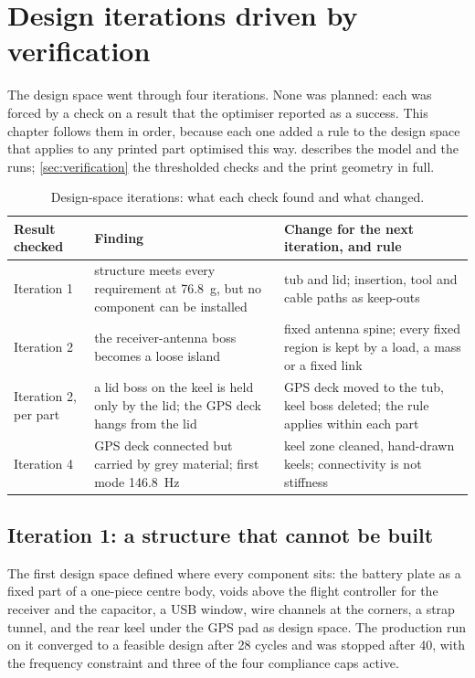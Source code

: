 \chapter{Design iterations driven by verification}\label{sec:iterations}

The design space went through four iterations. None was planned: each was forced by a check on a result that the optimiser reported as a success. This chapter follows them in order, because each one added a rule to the design space that applies to any printed part optimised this way.  describes the model and the runs; \cref{sec:verification} the thresholded checks and the print geometry in full.

\begin{table}[htbp]
\centering\small
\caption{Design-space iterations: what each check found and what changed.}\label{tab:iter-summary}
\begin{tabularx}{\linewidth}{@{}lXX@{}}
\toprule
Result checked & Finding & Change for the next iteration, and rule\\
\midrule
Iteration 1 & structure meets every requirement at \SI{76.8}{g}, but no component can be installed & tub and lid; insertion, tool and cable paths as keep-outs\\
Iteration 2 & the receiver-antenna boss becomes a loose island & fixed antenna spine; every fixed region is kept by a load, a mass or a fixed link\\
Iteration 2, per part & a lid boss on the keel is held only by the lid; the GPS deck hangs from the lid & GPS deck moved to the tub, keel boss deleted; the rule applies within each part\\
Iteration 4 & GPS deck connected but carried by grey material; first mode \SI{146.8}{Hz} & keel zone cleaned, hand-drawn keels; connectivity is not stiffness\\
\bottomrule
\end{tabularx}
\end{table}

\section{Iteration 1: a structure that cannot be built}\label{sec:iter-1}

The first design space defined where every component sits: the battery plate as a fixed part of a one-piece centre body, voids above the flight controller for the receiver and the capacitor, a USB window, wire channels at the corners, a strap tunnel, and the rear keel under the GPS pad as design space. The production run on it converged to a feasible design after 28 cycles and was stopped after 40, with the frequency constraint and three of the four compliance caps active.

